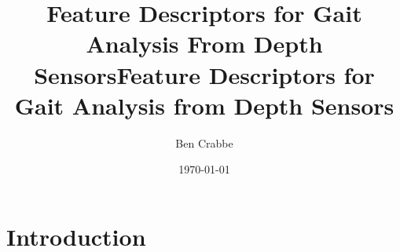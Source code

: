 \documentclass[11pt]{article} %
\title{%
Feature Descriptors for Gait Analysis From Depth Sensors}
\newcommand{\comment}[1]{}
\begin{document}
\comment{

A statement of the aims and objectives of the project.


A description of the background and context of the project and its relation to work already done in the area. (Note that while you are free to re-use work from your research review here, it would normally be appropriate to tailor your earlier work to better suport the final contributions of the project. Typically you will include new related work which was found to be important, while excluding previously studied work which has become irrelevant, and modifying your earlier write-up with more or less detail, as required).



A description of the work carried out. This should include details of technical or scientific problems tackled, solutions proposed, and the design and development of software.



A description and analysis of results obtained.



A critical evaluation of the work. This is an analysis of the extent to which the project has achieved its objectives, and whether the choices that were made were, with hindsight, the best ones.
Suggestions on possible improvements and/or further work.


	Introduction:
		Discuss SPHERE, the need for in home gait analysis, references that show this is possible from kinect, 
	The existing pipeline:
		Kinect SDK skeletons... shotton et al.
		same as lit review, but go into more detail on the dimensionality reduction/manifold method
	

}

\title{Feature Descriptors for Gait Analysis from Depth Sensors}



\author{Ben Crabbe}

\date{\today}



\maketitle

\section{Introduction}
\end{document}
